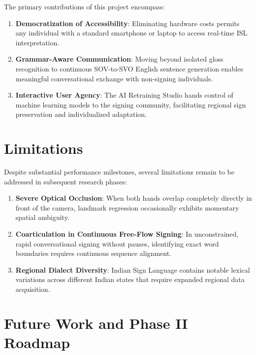 The primary contributions of this project encompass:
\begin{enumerate}
    \item \textbf{Democratization of Accessibility}: Eliminating hardware costs permits any individual with a standard smartphone or laptop to access real-time ISL interpretation.
    \item \textbf{Grammar-Aware Communication}: Moving beyond isolated gloss recognition to continuous SOV-to-SVO English sentence generation enables meaningful conversational exchange with non-signing individuals.
    \item \textbf{Interactive User Agency}: The AI Retraining Studio hands control of machine learning models to the signing community, facilitating regional sign preservation and individualized adaptation.
\end{enumerate}

\section{Limitations}

Despite substantial performance milestones, several limitations remain to be addressed in subsequent research phases:
\begin{enumerate}
    \item \textbf{Severe Optical Occlusion}: When both hands overlap completely directly in front of the camera, landmark regression occasionally exhibits momentary spatial ambiguity.
    \item \textbf{Coarticulation in Continuous Free-Flow Signing}: In unconstrained, rapid conversational signing without pauses, identifying exact word boundaries requires continuous sequence alignment.
    \item \textbf{Regional Dialect Diversity}: Indian Sign Language contains notable lexical variations across different Indian states that require expanded regional data acquisition.
\end{enumerate}

\section{Future Work and Phase II Roadmap}

